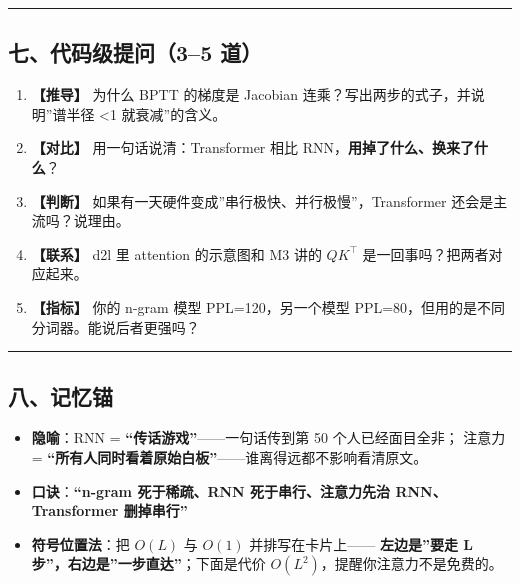 \documentclass[
  chinese,
  11pt,
]{ctexart}
\providecommand{\tightlist}{%
  \setlength{\itemsep}{0pt}\setlength{\parskip}{0pt}}
\begin{document}
\begin{center}\rule{0.5\linewidth}{0.5pt}\end{center}

\subsection{七、代码级提问（3--5 道）}\label{ux4e03ux4ee3ux7801ux7ea7ux63d0ux95ee35-ux9053-1}

\begin{enumerate}
\def\labelenumi{\arabic{enumi}.}
\tightlist
\item
  \textbf{【推导】} 为什么 BPTT 的梯度是 Jacobian 连乘？写出两步的式子，并说明''谱半径 \textless1 就衰减''的含义。
\item
  \textbf{【对比】} 用一句话说清：Transformer 相比 RNN，\textbf{用掉了什么、换来了什么}？
\item
  \textbf{【判断】} 如果有一天硬件变成''串行极快、并行极慢''，Transformer 还会是主流吗？说理由。
\item
  \textbf{【联系】} d2l 里 attention 的示意图和 M3 讲的 \(QK^\top\) 是一回事吗？把两者对应起来。
\item
  \textbf{【指标】} 你的 n-gram 模型 PPL=120，另一个模型 PPL=80，但用的是不同分词器。能说后者更强吗？
\end{enumerate}

\begin{center}\rule{0.5\linewidth}{0.5pt}\end{center}

\subsection{八、记忆锚}\label{ux516bux8bb0ux5fc6ux951a-1}

\begin{itemize}
\tightlist
\item
  \textbf{隐喻}：RNN = \textbf{``传话游戏''}------一句话传到第 50 个人已经面目全非； 注意力 = \textbf{``所有人同时看着原始白板''}------谁离得远都不影响看清原文。
\item
  \textbf{口诀}：\textbf{``n-gram 死于稀疏、RNN 死于串行、注意力先治 RNN、Transformer 删掉串行''}
\item
  \textbf{符号位置法}：把 \(O(L)\) 与 \(O(1)\) 并排写在卡片上------ \textbf{左边是''要走 L 步''，右边是''一步直达''}；下面是代价 \(O(L^2)\)，提醒你注意力不是免费的。
\end{itemize}

\newpage
\end{document}
